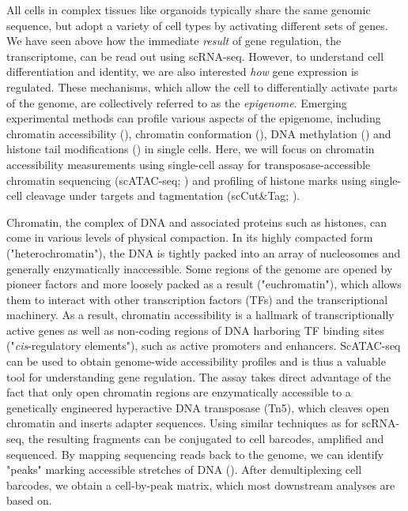 All cells in complex tissues like organoids typically share the same genomic sequence, but adopt a variety of cell types by activating different sets of genes. We have seen above how the immediate \textit{result} of gene regulation, the transcriptome, can be read out using scRNA-seq. However, to understand cell differentiation and identity, we are also interested \textit{how} gene expression is regulated. These mechanisms, which allow the cell to differentially activate parts of the genome, are collectively referred to as the \textit{epigenome}. Emerging experimental methods can profile various aspects of the epigenome, including chromatin accessibility (\cite{buenrostro_single-cell_2015,cusanovich_multiplex_2015}), chromatin conformation (\cite{ramani_massively_2017,stevens_3d_2017}), DNA methylation (\cite{smallwood_single-cell_2014}) and histone tail modifications (\cite{kaya-okur_cuttag_2019,bartosovic_single-cell_2021,ku_single-cell_2019,hainer_profiling_2019}) in single cells. Here, we will focus on chromatin accessibility measurements using single-cell assay for transposase-accessible chromatin sequencing (scATAC-seq; \cite{buenrostro_single-cell_2015}) and profiling of histone marks using single-cell cleavage under targets and tagmentation (scCut\&Tag; \cite{kaya-okur_cuttag_2019}).

Chromatin, the complex of DNA and associated proteins such as histones, can come in various levels of physical compaction. In its highly compacted form ("heterochromatin"), the DNA is tightly packed into an array of nucleosomes and generally enzymatically inaccessible. Some regions of the genome are opened by pioneer factors and more loosely packed as a result ("euchromatin"), which allows them to interact with other transcription factors (TFs) and the transcriptional machinery. As a result, chromatin accessibility is a hallmark of transcriptionally active genes as well as non-coding regions of DNA harboring TF binding sites ("\textit{cis}-regulatory elements"), such as active promoters and enhancers. ScATAC-seq can be used to obtain genome-wide accessibility profiles and is thus a valuable tool for understanding gene regulation. The assay takes direct advantage of the fact that only open chromatin regions are enzymatically accessible to a genetically engineered hyperactive DNA transposase (Tn5), which cleaves open chromatin and inserts adapter sequences. Using similar techniques as for scRNA-seq, the resulting fragments can be conjugated to cell barcodes, amplified and sequenced. By mapping sequencing reads back to the genome, we can identify "peaks" marking accessible stretches of DNA (\cite{zhang_model-based_2008}). After demultiplexing cell barcodes, we obtain a cell-by-peak matrix, which most downstream analyses are based on.

